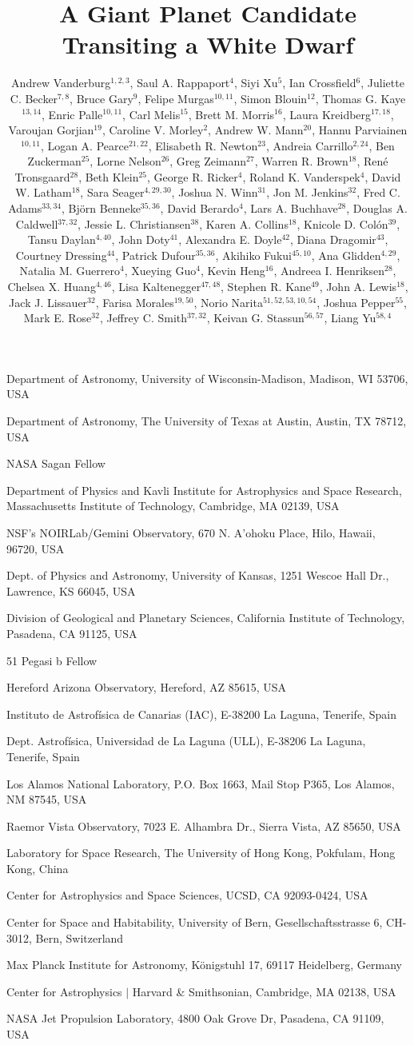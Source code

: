 \documentclass{nature3}
\title{A Giant Planet Candidate Transiting a White Dwarf}
\author{Andrew Vanderburg$^{1,2,3}$,
Saul A. Rappaport$^{4}$,
Siyi Xu$^{5}$,
Ian Crossfield$^{6}$,
Juliette C. Becker$^{7,8}$,
Bruce Gary$^{9}$,
Felipe Murgas$^{10,11}$,
Simon Blouin$^{12}$,
Thomas G. Kaye$^{13,14}$,
Enric Palle$^{10,11}$,
Carl Melis$^{15}$,
Brett M. Morris$^{16}$,
Laura Kreidberg$^{17,18}$,
Varoujan Gorjian$^{19}$,
Caroline V. Morley$^{2}$,
Andrew W. Mann$^{20}$,
Hannu Parviainen$^{10,11}$,
Logan A. Pearce$^{21,22}$,
Elisabeth R. Newton$^{23}$,
Andreia Carrillo$^{2,24}$,
Ben Zuckerman$^{25}$,
Lorne Nelson$^{26}$,
Greg Zeimann$^{27}$,
Warren R. Brown$^{18}$,
Ren\'e Tronsgaard$^{28}$,
Beth Klein$^{25}$,
George R. Ricker$^{4}$,
Roland K. Vanderspek$^{4}$,
David W. Latham$^{18}$,
Sara Seager$^{4,29,30}$,
Joshua N. Winn$^{31}$,
Jon M. Jenkins$^{32}$,
Fred C. Adams$^{33,34}$,
Bj\"orn Benneke$^{35,36}$,
David Berardo$^{4}$,
Lars A. Buchhave$^{28}$,
Douglas A. Caldwell$^{37,32}$,
Jessie L. Christiansen$^{38}$,
Karen A. Collins$^{18}$,
Knicole D. Col\'{o}n$^{39}$,
Tansu Daylan$^{4,40}$,
John Doty$^{41}$,
Alexandra E. Doyle$^{42}$,
Diana Dragomir$^{43}$,
Courtney Dressing$^{44}$,
Patrick Dufour$^{35,36}$,
Akihiko Fukui$^{45,10}$,
Ana Glidden$^{4,29}$,
Natalia M. Guerrero$^{4}$,
Xueying Guo$^{4}$,
Kevin Heng$^{16}$,
Andreea I. Henriksen$^{28}$,
Chelsea X. Huang$^{4,46}$,
Lisa Kaltenegger$^{47,48}$,
Stephen R. Kane$^{49}$,
John A. Lewis$^{18}$,
Jack J. Lissauer$^{32}$,
Farisa Morales$^{19,50}$,
Norio Narita$^{51,52,53,10,54}$,
Joshua Pepper$^{55}$,
Mark E. Rose$^{32}$,
Jeffrey C. Smith$^{37,32}$,
Keivan G. Stassun$^{56,57}$,
Liang Yu$^{58,4}$
}
\begin{document}
\maketitle
\scriptsize
\begin{affiliations}
\item Department of Astronomy, University of Wisconsin-Madison, Madison, WI 53706, USA
\item Department of Astronomy, The University of Texas at Austin, Austin, TX 78712, USA
\item NASA Sagan Fellow
\item Department of Physics and Kavli Institute for Astrophysics and Space Research, Massachusetts Institute of Technology, Cambridge, MA 02139, USA
\item NSF’s NOIRLab/Gemini Observatory, 670 N. A’ohoku Place, Hilo, Hawaii, 96720, USA
\item Dept. of Physics and Astronomy, University of Kansas, 1251 Wescoe Hall Dr., Lawrence, KS 66045, USA
\item Division of Geological and Planetary Sciences, California Institute of Technology, Pasadena, CA 91125, USA
\item 51 Pegasi b Fellow
\item Hereford Arizona Observatory, Hereford, AZ 85615, USA
\item Instituto de Astrof\'isica de Canarias (IAC), E-38200 La Laguna, Tenerife, Spain
\item Dept. Astrof\'isica, Universidad de La Laguna (ULL), E-38206 La Laguna, Tenerife, Spain
\item Los Alamos National Laboratory, P.O. Box 1663, Mail Stop P365, Los Alamos, NM 87545, USA
\item Raemor Vista Observatory, 7023 E. Alhambra Dr., Sierra Vista, AZ 85650, USA
\item Laboratory for Space Research, The University of Hong Kong, Pokfulam, Hong Kong, China
\item Center for Astrophysics and Space Sciences, UCSD, CA 92093-0424, USA
\item Center for Space and Habitability, University of Bern, Gesellschaftsstrasse 6, CH-3012, Bern, Switzerland
\item Max Planck Institute for Astronomy, K{\"o}nigstuhl 17, 69117 Heidelberg, Germany
\item Center for Astrophysics $|$  Harvard \& Smithsonian, Cambridge, MA 02138, USA
\item NASA Jet Propulsion Laboratory, 4800 Oak Grove Dr, Pasadena, CA 91109, USA

\end{affiliations}
\end{document}
